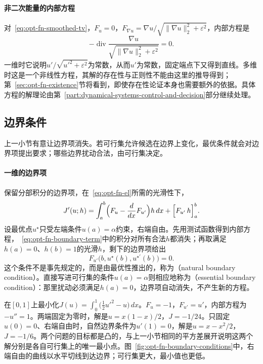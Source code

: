 \paragraph{非二次能量的内部方程}
对~\eqref{eq:opt-fn-smoothed-tv}，$F_u=0$，$F_{\nabla u}=\nabla u/\sqrt{\|\nabla u\|_2^2+\varepsilon^2}$，内部方程是
\[
 -\operatorname{div}\frac{\nabla u}{\sqrt{\|\nabla u\|_2^2+\varepsilon^2}}=0 .
\]
一维时它说明$u'/\sqrt{u'^2+\varepsilon^2}$为常数，从而$u'$为常数，固定端点下又得到直线。多维时这是一个非线性方程，其解的存在性与正则性不能由这里的推导得到；第~\ref{sec:opt-fn-existence}节将看到，即使存在性论证本身也需要额外的依据。具体方程的解理论由第~\ref{part:dynamical-systems-control-and-decision}部分继续处理。

\subsection{边界条件}
\label{sec:opt-fn-boundary}

上一小节有意让边界项消失。若可行集允许候选在边界上变化，最优条件就会对边界项提出要求；哪些边界扰动合法，由可行集决定。

\paragraph{一维的边界项}
保留分部积分的边界项，在~\eqref{eq:opt-fn-el}所需的光滑性下，
\begin{equation}
 J'(u;h)=\int_a^b\Bigl(F_u-\frac{d}{dx}F_{u'}\Bigr)h\,dx+\Bigl[F_{u'}\,h\Bigr]_a^b .
 \label{eq:opt-fn-boundary-term}
\end{equation}
设最优点$u^\star$只受左端条件$u(a)=\alpha$约束，右端自由。先用测试函数得到内部方程，~\eqref{eq:opt-fn-boundary-term}中的积分对所有合法$h$都消失；再取满足$h(a)=0$、$h(b)=1$的光滑$h$，剩下的边界项给出
\[
 F_{u'}\bigl(b,u^\star(b),u^{\star\prime}(b)\bigr)=0 .
\]
这个条件不是事先规定的，而是由最优性推出的，称为（natural boundary condition）。直接写进可行集的条件$u(a)=\alpha$则相应地称为（essential boundary condition）：那里扰动必须满足$h(a)=0$，边界项自动消失，不产生新的方程。

\begin{example}[固定端与自由端]
\label{ex:opt-fn-free-end}
在$[0,1]$上最小化$J(u)=\int_0^1\bigl(\tfrac12u'^2-u\bigr)\,dx$。$F_u=-1$，$F_{u'}=u'$，内部方程为$-u''=1$。两端固定为零时，解是$u=x(1-x)/2$，$J=-1/24$。只固定$u(0)=0$、右端自由时，自然边界条件为$u'(1)=0$，解是$u=x-x^2/2$，$J=-1/6$。两个问题的目标都是凸的，与上一小节相同的平方差展开说明这两个解分别是各自可行集上的唯一最小点。图~\ref{fig:opt-fn-boundary-conditions}中，右端自由的曲线以水平切线到达边界；可行集更大，最小值也更低。
\end{example}

